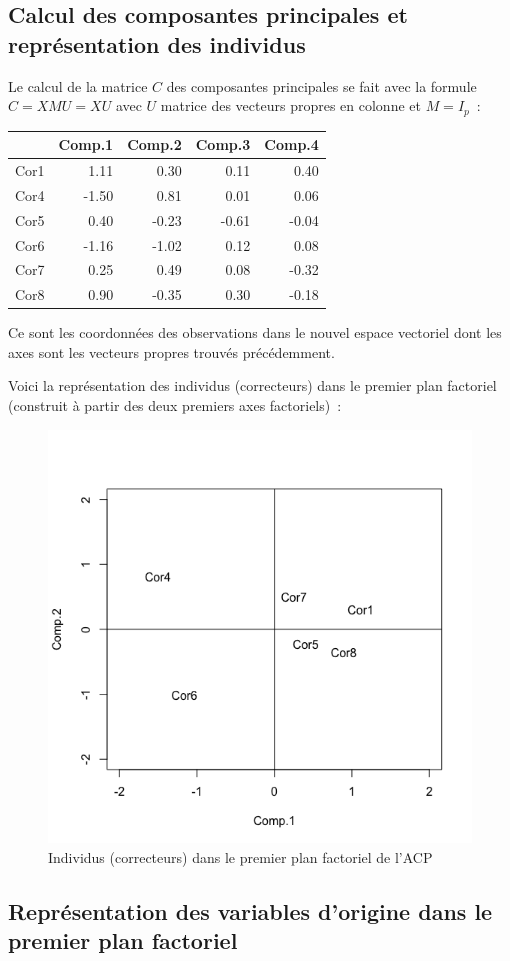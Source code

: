 \documentclass[a4paper,10pt]{report}
\begin{document}
\subsection{Calcul des composantes principales et représentation des individus}

Le calcul de la matrice $C$ des composantes principales se fait avec la formule $C = XMU = XU$ avec $U$ matrice des vecteurs propres en colonne et $M = I_p$~:

\begin{table}[H]
	\centering
	\begin{tabular}{r|rrrr}
		& Comp.1 & Comp.2 & Comp.3 & Comp.4 \\ 
		\hline
		Cor1 & 1.11 & 0.30 & 0.11 & 0.40 \\ 
		Cor4 & -1.50 & 0.81 & 0.01 & 0.06 \\ 
		Cor5 & 0.40 & -0.23 & -0.61 & -0.04 \\ 
		Cor6 & -1.16 & -1.02 & 0.12 & 0.08 \\ 
		Cor7 & 0.25 & 0.49 & 0.08 & -0.32 \\ 
		Cor8 & 0.90 & -0.35 & 0.30 & -0.18 \\ 
	\end{tabular}
\end{table}

Ce sont les coordonnées des observations dans le nouvel espace vectoriel dont les axes sont les vecteurs propres trouvés précédemment.

Voici la représentation des individus (correcteurs) dans le premier plan factoriel (construit à partir des deux premiers axes factoriels)~:

\begin{figure}[H]
	\centering
	\captionsetup{justification=centering, margin=2cm}
	\includegraphics[width=.3\linewidth]{img/2-1-2-individus-premier-plan-factoriel}
	\caption{\scriptsize Individus (correcteurs) dans le premier plan factoriel de l'ACP}
	\label{fig:individus_premier_plan_factoriel}
\end{figure}


\subsection{Représentation des variables d'origine dans le premier plan factoriel}
\end{document}
